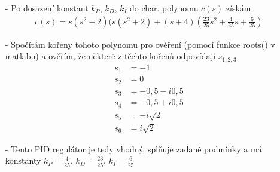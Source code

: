 \documentclass{article}
\begin{document}
\begin{itemize}
    \item[-] Po dosazení konstant $k_P$, $k_D$, $k_I$ do char. polynomu $c(s)$ získám:
    \begin{align*}
        c(s) = s(s^2 + 2)(s(s^2 + 2) + (s + 4)\left(\frac{23}{25}s^2+ \frac{4}{25}s + \frac{6}{25}\right)
    \end{align*}
    \item[-] Spočítám kořeny tohoto polynomu pro ověření (pomocí funkce roots() v matlabu) a ověřím, že některé z těchto kořenů odpovídají $s_{1,2,3}$
    \begin{align*}
        s_1 &= -1\\
        s_2 &= 0\\
        s_3 &= - 0,5 - i0,5\\
        s_4 &= - 0,5 + i0,5\\
        s_5 &= -i\sqrt{2}\\
        s_6 &= i\sqrt{2}
    \end{align*}
    \item[-] Tento PID regulátor je tedy vhodný, splňuje zadané podmínky a má konstanty $k_P= \frac{4}{25}$, $k_D=\frac{23}{25}$, $k_I=\frac{6}{25}$
    
\end{itemize}
\end{document}
